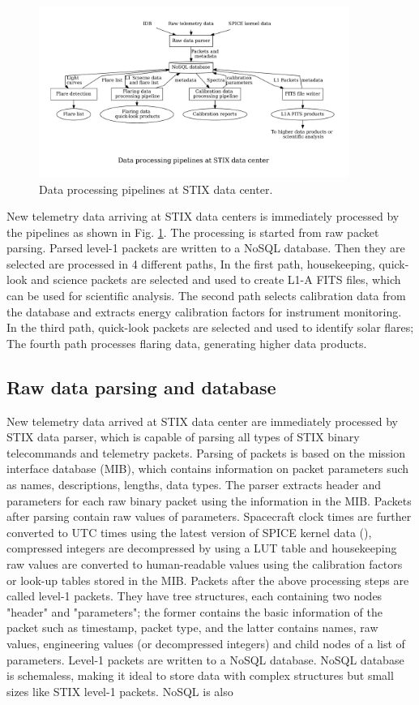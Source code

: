 \documentclass{aa}
\begin{document}
\begin{figure}
    \centering
    \includegraphics[width=0.9\textwidth]{figures/pipelines.pdf}
    \caption{Data processing pipelines at STIX data center.}
    \label{fig:main_pipelines}
\end{figure}
New telemetry data arriving at STIX data centers is immediately processed by the pipelines as shown 
in Fig. \ref{fig:main_pipelines}. 
The processing is started from raw packet parsing. Parsed level-1 packets are written to a NoSQL database. 
Then they are selected  are processed in 4 different paths, 
In the first path,  housekeeping, quick-look and science packets 
are selected and used to create L1-A FITS files, 
which can be used for scientific analysis. 
The second path selects calibration data from the database and extracts energy calibration factors for 
instrument monitoring. In the third path, quick-look packets are selected and used to identify solar
flares; The fourth path processes flaring data, 
generating higher data products.   

\subsection{Raw data parsing and database}
New telemetry data arrived at STIX data center are immediately processed by STIX data parser, 
which is capable of parsing all types of STIX binary telecommands and telemetry packets.   
Parsing of packets is based on the mission interface database (MIB), which 
contains information on packet parameters such as names, descriptions, lengths,
data types. The parser extracts header and parameters for each raw binary packet
using the information in the MIB.
Packets after parsing contain raw values of parameters. 
 Spacecraft clock times are further converted to UTC times using 
the latest version of SPICE kernel data (\cite{spice1996,spice2018}), compressed integers are  
decompressed by using a LUT table and 
housekeeping raw values are converted to 
human-readable values using the calibration factors or look-up tables stored in the MIB. 
Packets after the above processing steps are called level-1 packets. They
have tree structures, each containing two nodes "header" and "parameters";
the former contains the basic information  of the packet such as timestamp, packet type,
and the latter contains names, 
raw values, engineering values (or decompressed integers) and child nodes of a list of parameters.
Level-1 packets are written 
to a NoSQL database. 
NoSQL database is schemaless,  making it ideal to store data with complex
structures but small sizes like STIX level-1 packets.  
NoSQL is also 
\end{document}
